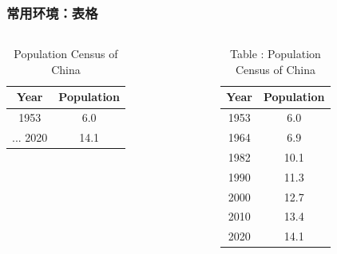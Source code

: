\begin{frame}[fragile]
\frametitle{常用环境：表格}
\begin{columns}
\begin{column}{0.6\textwidth}
  \begin{texcode}[gobble=4, moretexcs={\toprule,\midrule,\bottomrule},
      emph={[1]table,tabular}, emph={[2]booktabs}]
    \usepackage{booktabs} %
    \begin{table}
      \caption{Population Census of China}
      \label{tab:china-population}
      \begin{tabular}{cc}
        \toprule
          Year & Population \\
        \midrule
          1953 &  6.0 \\
          ...
          2020 & 14.1 \\
        \bottomrule
      \end{tabular}
    \end{table}
  \end{texcode}
\end{column}
\pause
\begin{column}{0.3\textwidth}
  \begin{table}
    \caption{\textcolor{keyword}{Table \thetable:} Population Census of China}
    \label{tab:china-population_}
    \footnotesize
    \begin{tabular}{cc}
      \toprule
        Year & Population \\
      \midrule
        1953 &  6.0 \\
        1964 &  6.9 \\
        1982 & 10.1 \\
        1990 & 11.3 \\
        2000 & 12.7 \\
        2010 & 13.4 \\
        2020 & 14.1 \\
      \bottomrule
    \end{tabular}
  \end{table}
\end{column}
\end{columns}
\end{frame}

